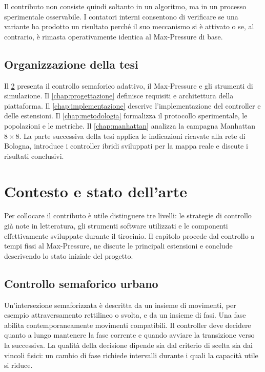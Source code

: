 \documentclass[12pt,a4paper,oneside]{report}
\numberwithin{equation}{chapter}
\begin{document}
Il contributo non consiste quindi soltanto in un algoritmo, ma in un processo
sperimentale osservabile. I contatori interni consentono di verificare se una
variante ha prodotto un risultato perché il suo meccanismo si è attivato o se,
al contrario, è rimasta operativamente identica al Max-Pressure di base.

\section{Organizzazione della tesi}

Il \cref{chap:stato-arte} presenta il controllo semaforico adattivo, il
Max-Pressure e gli strumenti di simulazione. Il \cref{chap:progettazione}
definisce requisiti e architettura della piattaforma. Il
\cref{chap:implementazione} descrive l'implementazione del controller e delle
estensioni. Il \cref{chap:metodologia} formalizza il protocollo sperimentale,
le popolazioni e le metriche. Il \cref{chap:manhattan} analizza la campagna
Manhattan $8\times8$. La parte successiva della tesi applica le indicazioni
ricavate alla rete di Bologna, introduce i controller ibridi sviluppati per la
mappa reale e discute i risultati conclusivi.


\chapter{Contesto e stato dell'arte}
\label{chap:stato-arte}

Per collocare il contributo è utile distinguere tre livelli:
le strategie di controllo già note in letteratura, gli strumenti software
utilizzati e le componenti effettivamente sviluppate durante il tirocinio. Il
capitolo procede dal controllo a tempi fissi al Max-Pressure, ne discute le
principali estensioni e conclude descrivendo lo stato iniziale del progetto.

\section{Controllo semaforico urbano}

Un'intersezione semaforizzata è descritta da un insieme di movimenti, per
esempio attraversamento rettilineo o svolta, e da un insieme di fasi. Una fase
abilita contemporaneamente movimenti compatibili. Il controller deve decidere
quanto a lungo mantenere la fase corrente e quando avviare la transizione verso
la successiva. La qualità della decisione dipende sia dal criterio di scelta
sia dai vincoli fisici: un cambio di fase richiede intervalli durante i quali
la capacità utile si riduce.
\end{document}
